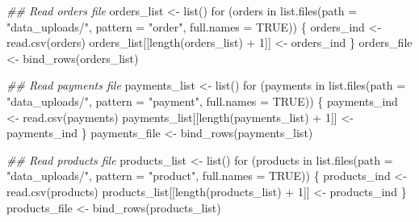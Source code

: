 \documentclass[
  letterpaper,
  DIV=11,
  numbers=noendperiod]{scrartcl}
\newenvironment{Shaded}{\begin{snugshade}}{\end{snugshade}}
\newcommand{\AttributeTok}[1]{\textcolor[rgb]{0.40,0.45,0.13}{#1}}
\newcommand{\ConstantTok}[1]{\textcolor[rgb]{0.56,0.35,0.01}{#1}}
\newcommand{\ControlFlowTok}[1]{\textcolor[rgb]{0.00,0.23,0.31}{#1}}
\newcommand{\DecValTok}[1]{\textcolor[rgb]{0.68,0.00,0.00}{#1}}
\newcommand{\DocumentationTok}[1]{\textcolor[rgb]{0.37,0.37,0.37}{\textit{#1}}}
\newcommand{\FunctionTok}[1]{\textcolor[rgb]{0.28,0.35,0.67}{#1}}
\newcommand{\NormalTok}[1]{\textcolor[rgb]{0.00,0.23,0.31}{#1}}
\newcommand{\OtherTok}[1]{\textcolor[rgb]{0.00,0.23,0.31}{#1}}
\newcommand{\SpecialCharTok}[1]{\textcolor[rgb]{0.37,0.37,0.37}{#1}}
\newcommand{\StringTok}[1]{\textcolor[rgb]{0.13,0.47,0.30}{#1}}
\begin{document}
\begin{Shaded}
\begin{Highlighting}[numbers=left,,]
\DocumentationTok{\#\# Read orders file}
\NormalTok{orders\_list }\OtherTok{\textless{}{-}} \FunctionTok{list}\NormalTok{()}
\ControlFlowTok{for}\NormalTok{ (orders }\ControlFlowTok{in} \FunctionTok{list.files}\NormalTok{(}\AttributeTok{path =} \StringTok{"data\_uploads/"}\NormalTok{, }\AttributeTok{pattern =} \StringTok{"order"}\NormalTok{, }\AttributeTok{full.names =} \ConstantTok{TRUE}\NormalTok{)) \{}
\NormalTok{  orders\_ind }\OtherTok{\textless{}{-}} \FunctionTok{read.csv}\NormalTok{(orders)}
\NormalTok{  orders\_list[[}\FunctionTok{length}\NormalTok{(orders\_list) }\SpecialCharTok{+} \DecValTok{1}\NormalTok{]] }\OtherTok{\textless{}{-}}\NormalTok{ orders\_ind}
\NormalTok{\}}
\NormalTok{orders\_file }\OtherTok{\textless{}{-}} \FunctionTok{bind\_rows}\NormalTok{(orders\_list)}

\DocumentationTok{\#\# Read payments file}
\NormalTok{payments\_list }\OtherTok{\textless{}{-}} \FunctionTok{list}\NormalTok{()}
\ControlFlowTok{for}\NormalTok{ (payments }\ControlFlowTok{in} \FunctionTok{list.files}\NormalTok{(}\AttributeTok{path =} \StringTok{"data\_uploads/"}\NormalTok{, }\AttributeTok{pattern =} \StringTok{"payment"}\NormalTok{, }\AttributeTok{full.names =} \ConstantTok{TRUE}\NormalTok{)) \{}
\NormalTok{  payments\_ind }\OtherTok{\textless{}{-}} \FunctionTok{read.csv}\NormalTok{(payments)}
\NormalTok{  payments\_list[[}\FunctionTok{length}\NormalTok{(payments\_list) }\SpecialCharTok{+} \DecValTok{1}\NormalTok{]] }\OtherTok{\textless{}{-}}\NormalTok{ payments\_ind}
\NormalTok{\}}
\NormalTok{payments\_file }\OtherTok{\textless{}{-}} \FunctionTok{bind\_rows}\NormalTok{(payments\_list)}

\DocumentationTok{\#\# Read products file}
\NormalTok{products\_list }\OtherTok{\textless{}{-}} \FunctionTok{list}\NormalTok{()}
\ControlFlowTok{for}\NormalTok{ (products }\ControlFlowTok{in} \FunctionTok{list.files}\NormalTok{(}\AttributeTok{path =} \StringTok{"data\_uploads/"}\NormalTok{, }\AttributeTok{pattern =} \StringTok{"product"}\NormalTok{, }\AttributeTok{full.names =} \ConstantTok{TRUE}\NormalTok{)) \{}
\NormalTok{  products\_ind }\OtherTok{\textless{}{-}} \FunctionTok{read.csv}\NormalTok{(products)}
\NormalTok{  products\_list[[}\FunctionTok{length}\NormalTok{(products\_list) }\SpecialCharTok{+} \DecValTok{1}\NormalTok{]] }\OtherTok{\textless{}{-}}\NormalTok{ products\_ind}
\NormalTok{\}}
\NormalTok{products\_file }\OtherTok{\textless{}{-}} \FunctionTok{bind\_rows}\NormalTok{(products\_list)}


\end{Highlighting}
\end{Shaded}
\end{document}
